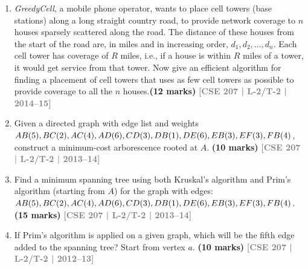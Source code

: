 \documentclass[12pt]{article}
\newcommand{\yr}[1]{\hfill\textcolor{gray}{\small\textbf{[#1]}}}
\newcommand{\mk}[1]{\textcolor{orange!70!black}{\small\textbf{(#1 marks)}}}
\begin{document}
\begin{enumerate}
\begin{center}
\begin{tikzpicture}[
    every node/.style={circle, draw, minimum size=0.9cm, font=\bfseries},
    edge label/.style={rectangle, draw=none, font=\normalfont\small},
  ]
  \end{tikzpicture}

\end{center}

\mk{10} \yr{CSE 207 | L-2/T-2 | 2014--15}


\item  \textit{GreedyCell}, a mobile phone operator, wants to place cell towers 
(base stations) along a long straight country road, to provide network coverage to $n$ 
houses sparsely scattered along the road. The distance of these houses from the start 
of the road are, in miles and in increasing order, $d_1, d_2, \ldots, d_n$. Each cell 
tower has coverage of $R$ miles, i.e., if a house is within $R$ miles of a tower, it 
would get service from that tower. Now give an efficient algorithm for finding a 
placement of cell towers that uses as few cell towers as possible to provide coverage 
to all the $n$ houses.\mk{12}
\yr{CSE 207 | L-2/T-2 | 2014--15}


\item Given a directed graph with edge list and weights $AB(5), BC(2), AC(4), AD(6),\\ CD(3), DB(1), DE(6), EB(3), EF(3), FB(4)$, construct a minimum-cost arborescence rooted at $A$. \mk{10}
\yr{CSE 207 | L-2/T-2 | 2013--14}


\item Find a minimum spanning tree using both Kruskal's algorithm and Prim's algorithm (starting from $A$) for the graph with edges: $AB(5), BC(2), AC(4), AD(6), CD(3),\\ DB(1), DE(6), EB(3), EF(3), FB(4)$. \mk{15}
\yr{CSE 207 | L-2/T-2 | 2013--14}


\item  If Prim's algorithm is applied on a given graph, which will be the fifth edge added to the spanning tree? Start from vertex $a$. \mk{10}
\yr{CSE 207 | L-2/T-2 | 2012--13}

\begin{center}

\end{center}
\end{enumerate}
\end{document}

